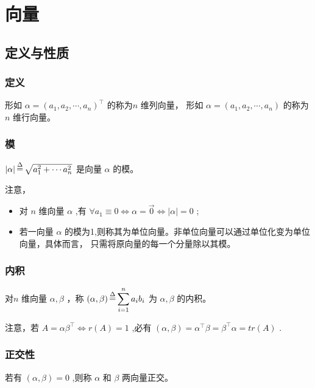 \chapter{向量}

\section{定义与性质}

\subsection{定义}

形如 $ \alpha = (a_1,a_2,\cdots,a_n)^\top $ 的称为$ n $ 维列向量，
形如 $ \alpha = (a_1,a_2,\cdots,a_n) $ 的称为$ n $ 维行向量。

\subsection{模}

$ |\alpha|\mathop=\limits^\Delta \sqrt{a_1^2+\cdots a_n^2} $ 是向量 $ \alpha $ 的模。

注意，
\begin{itemize}
    \item 对 $ n $ 维向量 $ \alpha $ ,有
    $ \forall a_1 \equiv 0 \Leftrightarrow \alpha = \vec 0 \Leftrightarrow |\alpha| = 0 $ ;
    \item 若一向量 $ \alpha $ 的模为1,则称其为单位向量。非单位向量可以通过单位化变为单位向量，具体而言，
    只需将原向量的每一个分量除以其模。
\end{itemize}

\subsection{内积}

对$ n $ 维向量 $ \alpha,\beta $ ，称 $ (\alpha,\beta) \mathop=\limits^\Delta \displaystyle\sum_{i=1}^n a_ib_i $ 为
$ \alpha,\beta $ 的内积。

注意，若 $ A = \alpha\beta^\top \Leftrightarrow r(A) = 1 $ ,必有
$ (\alpha,\beta) = \alpha^\top\beta = \beta^\top\alpha = tr(A) $ .

\subsection{正交性}

若有 $ (\alpha,\beta) = 0 $ ,则称 $ \alpha $ 和 $ \beta $ 两向量正交。


